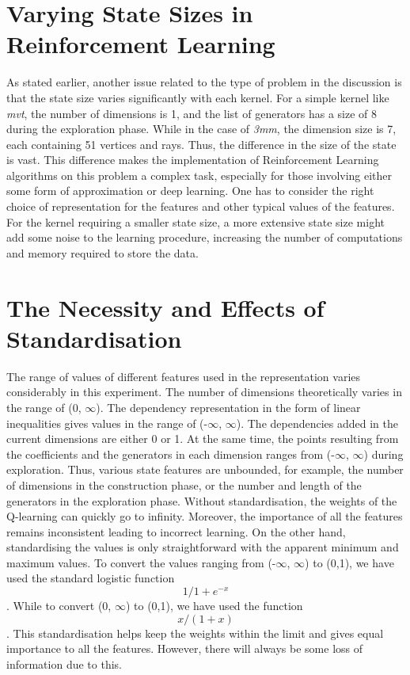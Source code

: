 \documentclass[logo,msc]{infthesis}           %
\begin{document}
\section{Varying State Sizes in Reinforcement Learning}
As stated earlier, another issue related to the type of problem in the discussion is that the state size varies significantly with each kernel. For a simple kernel like \textit{mvt}, the number of dimensions is 1, and the list of generators has a size of 8 during the exploration phase. While in the case of \textit{3mm}, the dimension size is 7, each containing 51 vertices and rays. Thus, the difference in the size of the state is vast. This difference makes the implementation of Reinforcement Learning algorithms on this problem a complex task, especially for those involving either some form of approximation or deep learning. One has to consider the right choice of representation for the features and other typical values of the features. For the kernel requiring a smaller state size, a more extensive state size might add some noise to the learning procedure, increasing the number of computations and memory required to store the data.

\section{The Necessity and Effects of Standardisation}
The range of values of different features used in the representation varies considerably in this experiment. The number of dimensions theoretically varies in the range of (0, $\infty$). The dependency representation in the form of linear inequalities gives values in the range of (-$\infty$, $\infty$). The dependencies added in the current dimensions are either 0 or 1. At the same time, the points resulting from the coefficients and the generators in each dimension ranges from (-$\infty$, $\infty$) during exploration. Thus, various state features are unbounded, for example, the number of dimensions in the construction phase, or the number and length of the generators in the exploration phase. Without standardisation, the weights of the Q-learning can quickly go to infinity. Moreover, the importance of all the features remains inconsistent leading to incorrect learning. On the other hand, standardising the values is only straightforward with the apparent minimum and maximum values. To convert the values ranging from (-$\infty$, $\infty$) to (0,1), we have used the standard logistic function \[{1/1+e^{-x}}\]. While to convert (0, $\infty$) to (0,1), we have used the function \[{x / (1 + x)}\]. This standardisation helps keep the weights within the limit and gives equal importance to all the features. However, there will always be some loss of information due to this.
\end{document}
